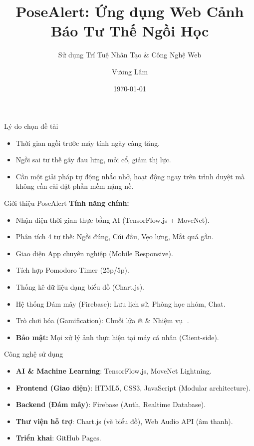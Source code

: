 \documentclass{beamer}
\title[PoseAlert]{PoseAlert: Ứng dụng Web Cảnh Báo Tư Thế Ngồi Học}
\subtitle{Sử dụng Trí Tuệ Nhân Tạo \& Công Nghệ Web}
\author{Vương Lâm}
\institute{Bài Tập Cuối Kỳ}
\date{\today}
\begin{document}
\begin{frame}
    \titlepage
\end{frame}

\begin{frame}{Lý do chọn đề tài}
    \begin{itemize}
        \item Thời gian ngồi trước máy tính ngày càng tăng.
        \item Ngồi sai tư thế gây đau lưng, mỏi cổ, giảm thị lực.
        \item Cần một giải pháp tự động nhắc nhở, hoạt động ngay trên trình duyệt mà không cần cài đặt phần mềm nặng nề.
    \end{itemize}
\end{frame}

\begin{frame}{Giới thiệu PoseAlert}
    \textbf{Tính năng chính:}
    \begin{itemize}
        \item Nhận diện thời gian thực bằng AI (TensorFlow.js + MoveNet).
        \item Phân tích 4 tư thế: Ngồi đúng, Cúi đầu, Vẹo lưng, Mắt quá gần.
        \item Giao diện App chuyên nghiệp (Mobile Responsive).
        \item Tích hợp Pomodoro Timer (25p/5p).
        \item Thống kê dữ liệu dạng biểu đồ (Chart.js).
        \item Hệ thống Đám mây (Firebase): Lưu lịch sử, Phòng học nhóm, Chat.
        \item Trò chơi hóa (Gamification): Chuỗi lửa 🔥 \& Nhiệm vụ 🎯.
        \item \textbf{Bảo mật:} Mọi xử lý ảnh thực hiện tại máy cá nhân (Client-side).
    \end{itemize}
\end{frame}

\begin{frame}{Công nghệ sử dụng}
    \begin{itemize}
        \item \textbf{AI \& Machine Learning}: TensorFlow.js, MoveNet Lightning.
        \item \textbf{Frontend (Giao diện)}: HTML5, CSS3, JavaScript (Modular architecture).
        \item \textbf{Backend (Đám mây)}: Firebase (Auth, Realtime Database).
        \item \textbf{Thư viện hỗ trợ}: Chart.js (vẽ biểu đồ), Web Audio API (âm thanh).
        \item \textbf{Triển khai}: GitHub Pages.
    \end{itemize}
\end{frame}
\end{document}
